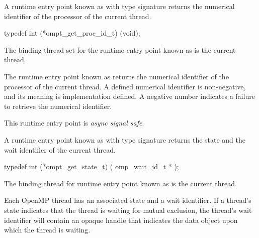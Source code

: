 \summary

A runtime entry point known as
 with type signature
 returns the numerical identifier
of the processor of the current thread.

\format

\begin{ccppspecific}
\begin{omptInquiry}
typedef int (*ompt_get_proc_id_t) (void);
\end{omptInquiry}
\end{ccppspecific}

\binding

The binding thread set for
the runtime entry point known as 
is the current thread.

\descr

The runtime entry point known as
 returns the numerical identifier
of the processor of the current thread.
A defined numerical identifier is non-negative, and
its meaning is implementation defined.
A negative number indicates a failure to retrieve the numerical identifier.

This runtime entry point is \emph{async signal safe}.






\label{sec:ompt_get_state_t}
\label{sec:ompt_get_state}

\summary
A runtime entry point known as 
with type signature 
returns the state and the wait identifier of the
current thread.

\format
\begin{ccppspecific}
\begin{omptInquiry}
typedef int (*ompt_get_state_t) (
  omp_wait_id_t *
);
\end{omptInquiry}
\end{ccppspecific}

\binding

The binding thread for runtime entry point known as
 is the current thread.

\descr

Each OpenMP thread has an associated state and a wait identifier.  If
a thread's state indicates that the thread is waiting for mutual
exclusion, the thread's wait identifier will contain an opaque handle
that indicates the data object upon which the thread is waiting.

